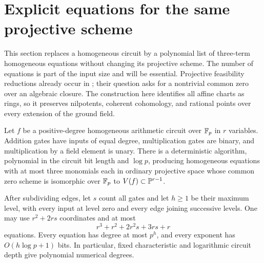 \section{Explicit equations for the same projective scheme}
\label{sp:sec:trinomials}
This section replaces a homogeneous circuit by a polynomial list of
three-term homogeneous equations without changing its projective scheme.
The number of equations is part of the input size and will be essential.
Projective feasibility reductions already occur in
\citet[Lemma~1 and Theorem~6]{sp-gkp}; their question asks for a nontrivial
common zero over an algebraic closure. The construction here identifies
all affine charts as rings, so it preserves nilpotents, coherent
cohomology, and rational points over every extension of the ground field.

\begin{theorem}
\label{sp:thm:trinomials}
Let $f$ be a positive-degree homogeneous arithmetic circuit over $\mathbb F_p$ in
$r$ variables. Addition gates have inputs of equal degree, multiplication
gates are binary, and multiplication by a field element is unary.
There is a deterministic algorithm, polynomial in the circuit bit length
and $\log p$, producing homogeneous equations with at most three monomials
each in ordinary projective space whose common zero scheme is isomorphic
over $\mathbb F_p$ to $V(f)\subset\mathbb P^{r-1}$.

After subdividing edges, let $s$ count all gates and let $h\geq1$ be their
maximum level, with every input at level zero and every edge joining
successive levels. One may use $r^2+2rs$ coordinates and at most
\[
 r^3+r^2+2r^2s+3rs+r
\]
equations. Every equation has degree at most $p^h$, and every exponent
has $O(h\log p+1)$ bits. In particular, fixed characteristic and
logarithmic circuit depth give polynomial numerical degrees.
\end{theorem}

